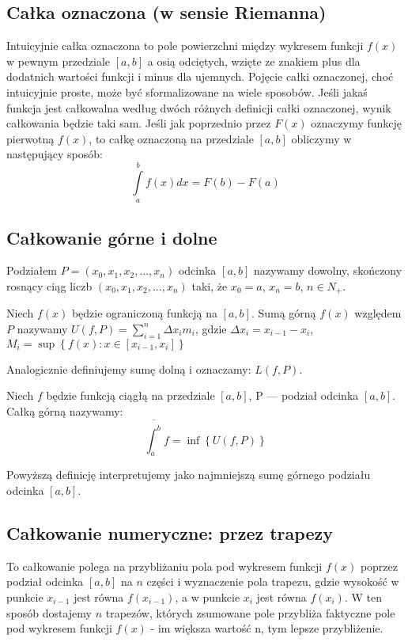 \documentclass[a4paper]{article}
\begin{document}
\subsection{Całka oznaczona (w sensie Riemanna)}

Intuicyjnie całka oznaczona to pole powierzchni między wykresem funkcji {$\displaystyle f(x)$} 
w pewnym przedziale {$\displaystyle [a, b]$} a osią odciętych, wzięte ze znakiem plus dla dodatnich wartości funkcji i minus dla ujemnych. Pojęcie całki oznaczonej, choć intuicyjnie proste, może być sformalizowane na wiele sposobów. Jeśli jakaś funkcja jest całkowalna według dwóch różnych definicji całki oznaczonej, wynik całkowania będzie taki sam. Jeśli jak poprzednio przez $F(x)$ oznaczymy funkcję pierwotną $f(x)$, to całkę oznaczoną na przedziale $[a, b]$ obliczymy w następujący sposób:
$$ \int \limits _{a}^{b}f(x)dx = F(b) - F(a)$$
	
\subsection{Całkowanie górne i dolne}
\begin{definition}
	Podziałem $P = (x_0, x_1, x_2, ..., x_n)$ odcinka $[a ,b]$ nazywamy dowolny, skończony rosnący ciąg liczb $(x_0, x_1, x_2, ..., x_n)$ taki, że $x_0 = a$, $x_n = b$, $n \in N_+$.
\end{definition}
\begin{definition}
	Niech $f(x)$ będzie ograniczoną funkcją na $[a, b]$. Sumą górną $f(x)$ względem $P$ nazywamy $U(f, P) = \sum_{i=1}^{n} \Delta x_i m_i$, gdzie $\Delta x_i = x_{i-1} - x_i$, $M_i = \sup \left\lbrace f(x) : x \in [x_{i-1}, x_i] \right\rbrace $
\end{definition}
Analogicznie definiujemy sumę dolną i oznaczamy: $L(f, P)$.
\begin{definition}
	Niech $f$ będzie funkcją ciągłą na przedziale $[a, b]$, P --- podział odcinka $[a, b]$. Całką górną nazywamy:
	$$\overline{\int_{a}^{{b}}} f = \inf \left\lbrace U(f, P) \right\rbrace $$
\end{definition}
Powyższą definicję interpretujemy jako najmniejszą sumę górnego podziału odcinka $[a, b]$.

\subsection{Całkowanie numeryczne: przez trapezy}
To całkowanie polega na przybliżaniu pola pod wykresem funkcji $f(x)$ poprzez podział odcinka $[a, b]$ na $n$ części i wyznaczenie pola trapezu, gdzie wysokość w punkcie $x_{i-1}$ jest równa $f(x_{i-1})$, a w punkcie $x_{i}$ jest równa $f(x_{i})$. W ten sposób dostajemy $n$ trapezów, których zsumowane pole przybliża faktyczne pole pod wykresem funkcji $f(x)$ - im większa wartość n, tym lepsze przybliżenie.
\end{document}

